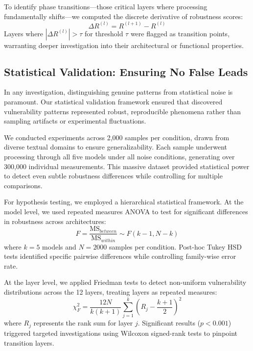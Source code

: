 To identify phase transitions—those critical layers where processing fundamentally shifts—we computed the discrete derivative of robustness scores:
\begin{equation}
\Delta R^{(l)} = R^{(l+1)} - R^{(l)}
\end{equation}
Layers where $|\Delta R^{(l)}| > \tau$ for threshold $\tau$ were flagged as transition points, warranting deeper investigation into their architectural or functional properties.

\subsection{Statistical Validation: Ensuring No False Leads}

In any investigation, distinguishing genuine patterns from statistical noise is paramount. Our statistical validation framework ensured that discovered vulnerability patterns represented robust, reproducible phenomena rather than sampling artifacts or experimental fluctuations.

We conducted experiments across 2,000 samples per condition, drawn from diverse textual domains to ensure generalizability. Each sample underwent processing through all five models under all noise conditions, generating over 300,000 individual measurements. This massive dataset provided statistical power to detect even subtle robustness differences while controlling for multiple comparisons.

For hypothesis testing, we employed a hierarchical statistical framework. At the model level, we used repeated measures ANOVA to test for significant differences in robustness across architectures:
\begin{equation}
F = \frac{\text{MS}_{between}}{\text{MS}_{within}} \sim F(k-1, N-k)
\end{equation}
where $k=5$ models and $N=2000$ samples per condition. Post-hoc Tukey HSD tests identified specific pairwise differences while controlling family-wise error rate.

At the layer level, we applied Friedman tests to detect non-uniform vulnerability distributions across the 12 layers, treating layers as repeated measures:
\begin{equation}
\chi^2_F = \frac{12N}{k(k+1)} \sum_{j=1}^k (R_j - \frac{k+1}{2})^2
\end{equation}
where $R_j$ represents the rank sum for layer $j$. Significant results ($p < 0.001$) triggered targeted investigations using Wilcoxon signed-rank tests to pinpoint transition layers.

